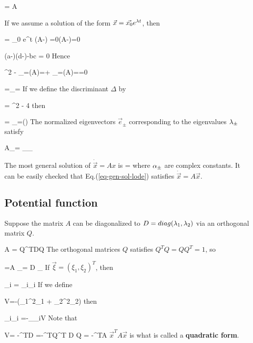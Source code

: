 \beq
{} = A 
\eeq


If we assume a solution of the form $\vec{x}=\vec{x_0}
e^{\lambda t}$, then


\beq 
{}= _0 e^{\lam t}
\implies 
(A-\lam)  =0\implies \det(A-\lam)=0
\eeq

\beq
 (a-\lam)(d-\lam)-bc = 0
\eeq
Hence

\beq
\lam^2 - 
_{=\tr(A)=\tau}\lam + 
_{=\det(A)=\delta}=0
\eeq

\beq
\lam =\lam_{\pm}=
\eeq
If we define the discriminant $\Delta$ by

\beq
\Delta = \tau^2 - 4 \delta
\eeq
then

\beq
\lam = \lam_\pm =(\tau\pm \sqrt{\Delta})
\eeq
The normalized eigenvectors $\vec{e}_\pm$ corresponding
to the eigenvalues $\lambda_\pm$ satisfy

\beq 
A_\pm = \lam_{\pm}_\pm
\eeq


The most general solution 
of $\dot{\vec{x}}=A x$ is
\beq
{} = 
\Re{}
\label{eq-gen-sol-lode}
\eeq
where $\alpha_\pm$ are complex constants. It can be easily checked that
Eq.(\ref{eq-gen-sol-lode}) satisfies $\dot{\vec{x}} = A \vec{x}$.

\subsection{Potential function}

Suppose the matrix $A$ can be diagonalized to $D=diag(\lambda_1, \lambda_2)$
via an orthogonal matrix $Q$.

\beq
A = Q^TDQ
\eeq
The orthogonal matrices $Q$ satisfies $Q^TQ=QQ^T=1$, so

\beq
{}=A
\implies
{}_{\dot{\vec{\xi}}}= D _{\vec{\xi}}
\eeq
If $\vec{\xi} = (\xi_1, \xi_2)^T$,
then

\beq
\dot{\xi}_i = \lam_i\xi_i\quad {}
\eeq
If we define

\beq
V=-(\lam_1\xi^2_1 + \lam_2\xi^2_2)
\eeq
then

\beq
\lam_i\xi_i =-\partial_{\xi_i}V \quad {}
\eeq
Note that

\beqa
V=
-\vec{\xi}^TD\vec{\xi}
=-^TQ^T D Q
= -^TA
\eeqa
$\vec{x}^TA\vec{x}$ is what is called a
{\bf quadratic form}.




